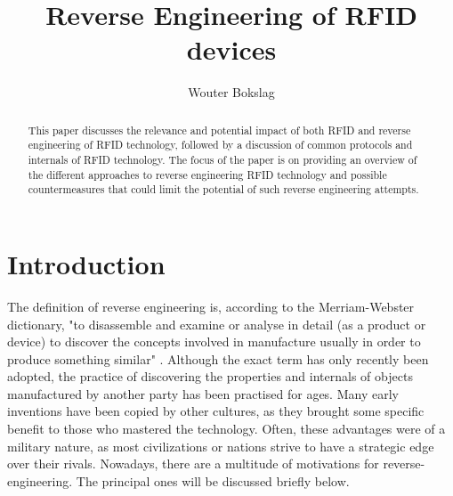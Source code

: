 \documentclass{llncs}
\begin{document}
\title{Reverse Engineering of RFID devices}
\author{Wouter Bokslag}
\maketitle

\begin{abstract}
This paper discusses the relevance and potential impact of both RFID and reverse engineering of RFID technology, followed by a discussion of common protocols and internals of RFID technology. The focus of the paper is on providing an overview of the different approaches to reverse engineering RFID technology and possible countermeasures that could limit the potential of such reverse engineering attempts. 
\end{abstract}

\section{Introduction}
\label{sec:introduction}
The definition of reverse engineering is, according to the Merriam-Webster dictionary, "to disassemble and examine or analyse in detail (as a product or device) to discover the concepts involved in manufacture usually in order to produce something similar" \cite{web:merweb-def}. Although the exact term has only recently been adopted, the practice of discovering the properties and internals of objects manufactured by another party has been practised for ages. Many early inventions have been copied by other cultures, as they brought some specific benefit to those who mastered the technology\cite{web:history}. Often, these advantages were of a military nature, as most civilizations or nations strive to have a strategic edge over their rivals. Nowadays, there are a multitude of motivations for reverse-engineering. The principal ones will be discussed briefly below.
\end{document}
